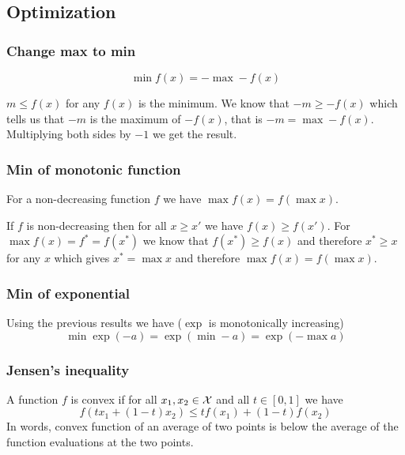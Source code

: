 \subsection{Optimization}\label{sec:Optimization}

\subsubsection{Change max to min}

\begin{equation}
\min f(x) = - \max -f(x)
\end{equation}

\begin{prf}
$m \leq f(x)$ for any $f(x)$ is the minimum.
We know that $-m \geq -f(x)$ which tells us that $-m$ is the maximum of $-f(x)$, that is $- m = \max - f(x)$.
Multiplying both sides by $-1$ we get the result.
\end{prf}

\subsubsection{Min of monotonic function}

For a non-decreasing function $f$ we have $\max f(x) = f(\max x)$.

\begin{prf}
If $f$ is non-decreasing then for all $x \geq x'$ we have $f(x) \geq f(x')$.
For $\max f(x) = f^* = f(x^*)$ we know that $f(x^*) \geq f(x)$ and therefore
$x^* \geq x$ for any $x$ which gives $x^* = \max x$ and therefore $\max f(x) = f(\max x)$.
\end{prf}


\subsubsection{Min of exponential}

Using the previous results we have ($\exp$ is monotonically increasing)
\begin{equation}\label{eq:MinExp}
\min \exp( - a) = \exp (\min -a) = \exp (- \max a)
\end{equation}

\subsubsection{Jensen's inequality}

A function $f$ is convex if for all $x_1, x_2 \in \mathcal{X}{}$ and all $t \in [0,1]$ we have
\begin{equation}\label{eq:ConvexDef}
f(tx_1 + (1-t)x_2) \leq t f(x_1) + (1-t)f(x_2)
\end{equation}
In words, convex function of an average of two points is below the average of the function evaluations at the two points.

